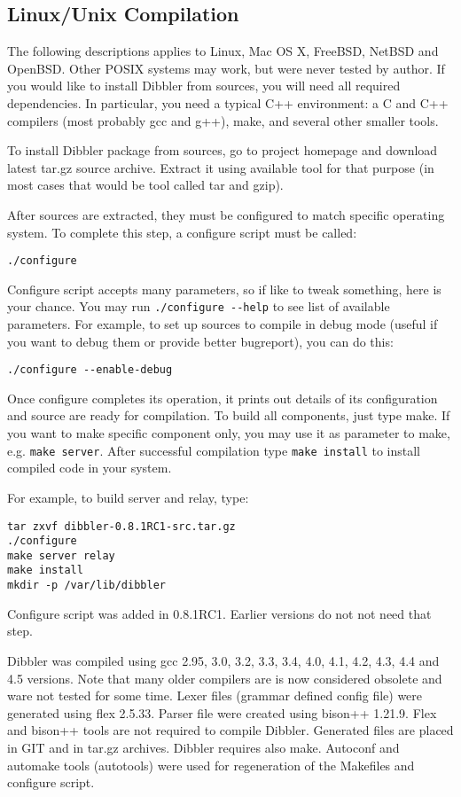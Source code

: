 \subsection{Linux/Unix Compilation}
The following descriptions applies to Linux, Mac OS X, FreeBSD, NetBSD
and OpenBSD. Other POSIX systems may work, but were never tested by
author. If you would like to install Dibbler from sources, you will need all
required dependencies. In particular, you need a typical C++
environment: a C and C++ compilers (most probably gcc and g++), make,
and several other smaller tools.

To install Dibbler package from sources, go to project homepage and
download latest tar.gz source archive. Extract it using available tool
for that purpose (in most cases that would be tool called tar and
gzip).

After sources are extracted, they must be configured to match specific
operating system. To complete this step, a configure script must be
called:
\begin{lstlisting}
./configure
\end{lstlisting}

Configure script accepts many parameters, so if like to tweak
something, here is your chance. You may run \verb+./configure --help+
to see list of available parameters. For example, to set up sources to
compile in debug mode (useful if you want to debug them or provide
better bugreport), you can do this:

\begin{lstlisting}
./configure --enable-debug
\end{lstlisting}

Once configure completes its operation, it prints out details of its
configuration and source are ready for compilation. To build all
components, just type make. If you want to make specific component
only, you may use it as parameter to make, e.g. 
\verb+make server+. After successful compilation type \verb+make install+ to
install compiled code in your system.

For example, to build server and relay, type:

\begin{lstlisting}
tar zxvf dibbler-0.8.1RC1-src.tar.gz
./configure
make server relay
make install
mkdir -p /var/lib/dibbler
\end{lstlisting}

Configure script was added in 0.8.1RC1. Earlier versions do not not
need that step.

Dibbler was compiled using gcc 2.95, 3.0, 3.2, 3.3, 3.4, 4.0, 4.1,
4.2, 4.3, 4.4 and 4.5 versions. Note that many older compilers are is
now considered obsolete and ware not tested for some time. Lexer files
(grammar defined config file) were generated using flex 2.5.33. Parser
file were created using bison++ 1.21.9. Flex and bison++ tools are not
required to compile Dibbler. Generated files are placed in GIT and in
tar.gz archives. Dibbler requires also make. Autoconf and automake
tools (autotools) were used for regeneration of the Makefiles and
configure script.
 
